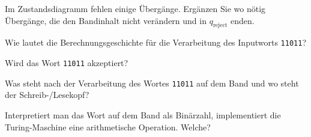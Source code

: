 \begin{teilaufgaben}
\item
Im Zustandsdiagramm fehlen einige Übergänge.
Ergänzen Sie wo nötig Übergänge, die den Bandinhalt nicht verändern und
in $q_{\text{reject}}$ enden.
\item
Wie lautet die Berechnungsgeschichte für die Verarbeitung des Inputworts
\texttt{11011}?
\item
Wird das Wort \texttt{11011} akzeptiert?
\item
Was steht nach der Verarbeitung des Wortes \texttt{11011} auf dem Band
und wo steht der Schreib-/Lesekopf?
\item
Interpretiert man das Wort auf dem Band als Binärzahl, implementiert
die Turing-Maschine eine arithmetische Operation.
Welche?
\end{teilaufgaben}

